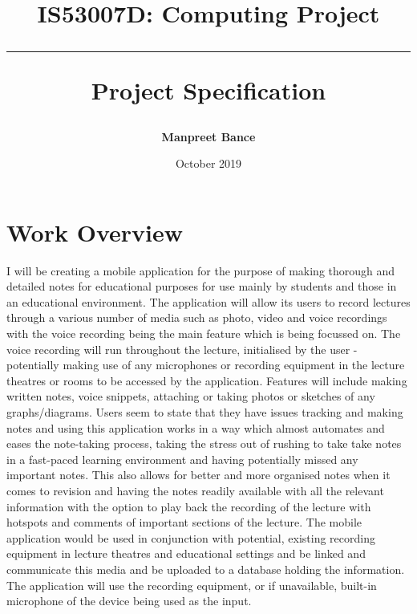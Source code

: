 \documentclass{report}
\title{\textbf{IS53007D: Computing Project} \vspace{0.5cm} \hrule \vspace{0.5cm} Project Specification}
\date{October 2019}
\author{\textbf{Manpreet Bance}}
\begin{document}
\maketitle


\section{Work Overview}
	I will be creating a mobile application for the purpose of making thorough and detailed notes for educational purposes for use mainly by students and those in an educational environment. The application will allow its users to record lectures through a various number of media such as photo, video and voice recordings with the voice recording being the main feature which is being focussed on. The voice recording will run throughout the lecture, initialised by the user - potentially making use of any microphones or recording equipment in the lecture theatres or rooms to be accessed by the application. Features will include making written notes, voice snippets, attaching or taking photos or sketches of any graphs/diagrams.
	Users seem to state that they have issues tracking and making notes and using this application works in a way which almost automates and eases the note-taking process, taking the stress out of rushing to take take notes in a fast-paced learning environment and having potentially missed any important notes. This also allows for better and more organised notes when it comes to revision and having the notes readily available with all the relevant information with the option to play back the recording of the lecture with hotspots and comments of important sections of the lecture.
	The mobile application would be used in conjunction with potential, existing recording equipment in lecture theatres and educational settings and be linked and communicate this media and be uploaded to a database holding the information. The application will use the recording equipment, or if unavailable, built-in microphone of the device being used as the input.
\end{document}
